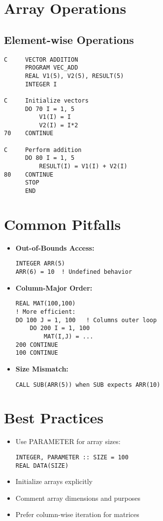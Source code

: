 \documentclass{book}
\begin{document}
\section{Array Operations}
\subsection*{Element-wise Operations}
\begin{verbatim}
C     VECTOR ADDITION
      PROGRAM VEC_ADD
      REAL V1(5), V2(5), RESULT(5)
      INTEGER I
      
C     Initialize vectors
      DO 70 I = 1, 5
          V1(I) = I
          V2(I) = I*2
70    CONTINUE

C     Perform addition
      DO 80 I = 1, 5
          RESULT(I) = V1(I) + V2(I)
80    CONTINUE
      STOP
      END
\end{verbatim}

\section{Common Pitfalls}
\begin{itemize}
\item \textbf{Out-of-Bounds Access:}
\begin{verbatim}
INTEGER ARR(5)
ARR(6) = 10  ! Undefined behavior
\end{verbatim}

\item \textbf{Column-Major Order:}
\begin{verbatim}
REAL MAT(100,100)
! More efficient:
DO 100 J = 1, 100   ! Columns outer loop
    DO 200 I = 1, 100
        MAT(I,J) = ...
200 CONTINUE
100 CONTINUE
\end{verbatim}

\item \textbf{Size Mismatch:}
\begin{verbatim}
CALL SUB(ARR(5)) when SUB expects ARR(10)
\end{verbatim}
\end{itemize}

\section{Best Practices}
\begin{itemize}
\item Use PARAMETER for array sizes:
\begin{verbatim}
INTEGER, PARAMETER :: SIZE = 100
REAL DATA(SIZE)
\end{verbatim}

\item Initialize arrays explicitly
\item Comment array dimensions and purposes
\item Prefer column-wise iteration for matrices
\end{itemize}
\end{document}
